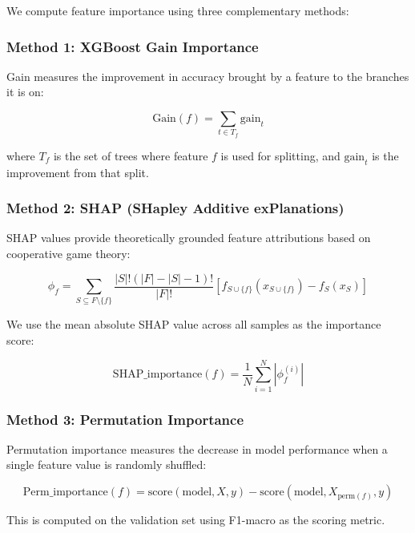 \documentclass[11pt,a4paper]{article}
\begin{document}
We compute feature importance using three complementary methods:

\subsubsection{Method 1: XGBoost Gain Importance}

Gain measures the improvement in accuracy brought by a feature to the branches it is on:

\begin{equation}
    \text{Gain}(f) = \sum_{t \in T_f} \text{gain}_t
\end{equation}

where $T_f$ is the set of trees where feature $f$ is used for splitting, and $\text{gain}_t$ is the improvement from that split.

\subsubsection{Method 2: SHAP (SHapley Additive exPlanations)}

SHAP values provide theoretically grounded feature attributions based on cooperative game theory:

\begin{equation}
    \phi_f = \sum_{S \subseteq F \setminus \{f\}} \frac{|S|!(|F|-|S|-1)!}{|F|!} \left[ f_{S \cup \{f\}}(x_{S \cup \{f\}}) - f_S(x_S) \right]
\end{equation}

We use the mean absolute SHAP value across all samples as the importance score:

\begin{equation}
    \text{SHAP\_importance}(f) = \frac{1}{N} \sum_{i=1}^N |\phi_f^{(i)}|
\end{equation}

\subsubsection{Method 3: Permutation Importance}

Permutation importance measures the decrease in model performance when a single feature value is randomly shuffled:

\begin{equation}
    \text{Perm\_importance}(f) = \text{score}(\text{model}, X, y) - \text{score}(\text{model}, X_{\text{perm}(f)}, y)
\end{equation}

This is computed on the validation set using F1-macro as the scoring metric.
\end{document}
